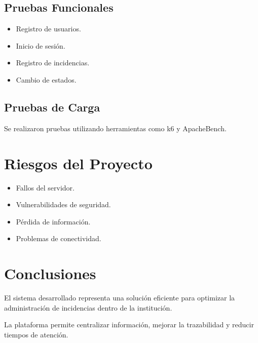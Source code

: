 \documentclass[12pt,letterpaper,oneside]{extreport}
\begin{document}
\section{Pruebas Funcionales}

\begin{itemize}
    \item Registro de usuarios.
    
    \item Inicio de sesión.
    
    \item Registro de incidencias.
    
    \item Cambio de estados.
\end{itemize}

\section{Pruebas de Carga}

Se realizaron pruebas utilizando herramientas como k6 y ApacheBench.

\chapter{Riesgos del Proyecto}

\begin{itemize}
    \item Fallos del servidor.
    
    \item Vulnerabilidades de seguridad.
    
    \item Pérdida de información.
    
    \item Problemas de conectividad.
\end{itemize}

\chapter{Conclusiones}

El sistema desarrollado representa una solución eficiente para optimizar la administración de incidencias dentro de la institución.

La plataforma permite centralizar información, mejorar la trazabilidad y reducir tiempos de atención.
\end{document}
